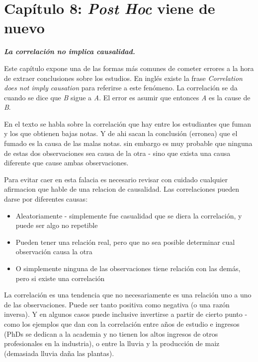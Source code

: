 \documentclass[letterpaper, 11pt]{article}
\begin{document}
\section*{Capítulo 8: \textit{Post Hoc} viene de nuevo}

\textbf{\textit{La correlación no implica causalidad.}}

Este capítulo expone una de las formas más comunes de cometer errores a la hora de extraer conclusiones sobre los estudios. En inglés existe la frase \textit{Correlation does not imply causation} para referirse a este fenómeno. La correlación se da cuando se dice que \textit{B} sigue a \textit{A}. El error es asumir que entonces \textit{A} es la cause de \textit{B}.

En el texto se habla sobre la correlación que hay entre los estudiantes que fuman y los que obtienen bajas notas. Y de ahi sacan la conclusión (erronea) que el fumado es la causa de las malas notas. sin embargo es muy probable que ninguna de estas dos observaciones sea causa de la otra - sino que exista una causa diferente que cause ambas observaciones.

Para evitar caer en esta falacia es necesario revisar con cuidado cualquier afirmacion que hable de una relacion de causalidad. Las correlaciones pueden darse por diferentes causas:

\begin{itemize}
	\item Aleatoriamente - simplemente fue casualidad que se diera la correlación, y puede ser algo no repetible
	\item Pueden tener una relación real, pero que no sea posible determinar cual observación causa la otra
	\item O simplemente ninguna de las observaciones tiene relación con las demás, pero si existe una correlación
\end{itemize}

La correlación es una tendencia que no necesariamente es una relación uno a uno de las observaciones. Puede ser tanto positiva como negativa (o una razón inversa). Y en algunos casos puede inclusive invertirse a partir de cierto punto - como los ejemplos que dan con la correlación entre años de estudio e ingresos (PhDs se dedican a la academia y no tienen los altos ingresos de otros profesionales en la industria), o entre la lluvia y la producción de maiz (demasiada lluvia daña las plantas).
\end{document}
